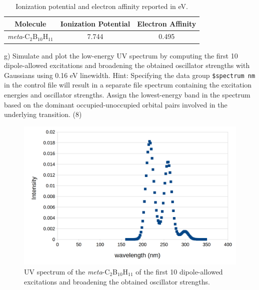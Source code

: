 \documentclass{article}
\begin{document}
\begin{table}[H]
  \centering
  \caption{Ionization potential and electron affinity
    reported in eV.}
  \begin{tabular}{ccc}
    Molecule & Ionization Potential & Electron Affinity \\
    \hline
    \textit{meta}-C$_2$B$_{10}$H$_{11}$ & 7.744 & 0.495 \\
  \end{tabular}
  \label{tab:ip_affinity}
\end{table}


\noindent g) Simulate and plot the low-energy UV spectrum by computing the
first 10 dipole-allowed excitations and broadening the obtained oscillator
strengths with Gaussians using 0.16 eV linewidth. Hint: Specifying the data
group \texttt{\$spectrum nm} in the control file will result in a separate file spectrum
containing the excitation energies and oscillator strengths. Assign the
lowest-energy band in the spectrum based on the dominant occupied-unoccupied
orbital pairs involved in the underlying transition. (8)

\begin{figure}[H]
  \centering
  \includegraphics[scale=0.5]{uv_spec.png}
  \caption{UV spectrum of the \textit{meta}-C$_2$B$_{10}$H$_{11}$ of the
    first 10 dipole-allowed excitations and broadening the obtained oscillator
    strengths.}
  \label{fig:spec}
\end{figure}
\end{document}
